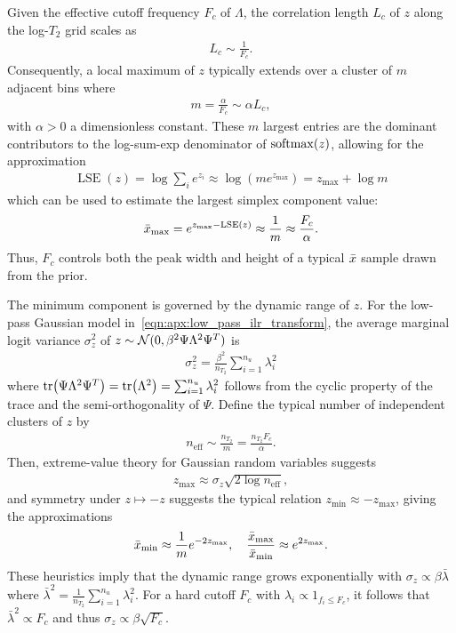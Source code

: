 Given the effective cutoff frequency $F_c$ of $\Lambda$, the correlation length $L_c$ of $z$ along the log-$T_2$ grid scales as
\begin{align}
    L_c \sim \frac{1}{F_c}.
\end{align}
Consequently, a local maximum of $z$ typically extends over a cluster of $m$ adjacent bins where
\begin{align}
    m = \frac{\alpha}{F_c} \sim \alpha L_c,
\end{align}
with $\alpha > 0$ a dimensionless constant.
These $m$ largest entries are the dominant contributors to the log-sum-exp denominator of $\Softmax{z}$, allowing for the approximation
\begin{align}
    \operatorname{LSE}(z) = \log \sum_i e^{z_i} \approx \log \left(m e^{z_{\max}}\right) = z_{\max} + \log m
\end{align}
which can be used to estimate the largest simplex component value:
\begin{align}\label{eqn:apx:xdist_max_component_estimate}
    \bar{x}_{\max} = e^{z_{\max} - \operatorname{LSE}(z)} \approx \frac{1}{m} \approx \frac{F_c}{\alpha}.
\end{align}
Thus, $F_c$ controls both the peak width and height of a typical $\bar{x}$ sample drawn from the prior.

The minimum component is governed by the dynamic range of $z$.
For the low-pass Gaussian model in~\cref{eqn:apx:low_pass_ilr_transform}, the average marginal logit variance $\sigma_z^2$ of $z \sim \mathcal{N}(\mathrm{0}, \beta^2 \Psi \Lambda^2 \Psi^T)$ is
\begin{align}
    \sigma_z^2 = \frac{\beta^2}{n_{T_2}}\sum_{i = 1}^{n_u} \lambda_i^2
\end{align}
where $\Tr{\Psi \Lambda^2 \Psi^T} = \Tr{\Lambda^2} = \sum_{i = 1}^{n_u} \lambda_i^2$ follows from the cyclic property of the trace and the semi-orthogonality of $\Psi$.
Define the typical number of independent clusters of $z$ by
\begin{align}
    n_{\mathrm{eff}} \sim \frac{n_{T_2}}{m} = \frac{n_{T_2} F_c}{\alpha}.
\end{align}
Then, extreme-value theory for Gaussian random variables suggests~\citep{leadbetter_extremes_2012}
\begin{align}
    z_{\max} \approx \sigma_z \sqrt{2 \log n_{\mathrm{eff}}},
\end{align}
and symmetry under $z \mapsto -z$ suggests the typical relation $z_{\min} \approx -z_{\max}$, giving the approximations
\begin{align}
    \bar{x}_{\min} \approx \frac{1}{m} e^{-2 z_{\max}}, \quad \frac{\bar{x}_{\max}}{\bar{x}_{\min}} \approx e^{2 z_{\max}}.
\end{align}
These heuristics imply that the dynamic range grows exponentially with $\sigma_z \propto \beta \bar{\lambda}$ where $\bar{\lambda}^2 = \frac{1}{n_{T_2}} \sum_{i = 1}^{n_u} \lambda_i^2$.
For a hard cutoff $F_c$ with $\lambda_i \propto 1_{f_i \le F_c}$, it follows that $\bar{\lambda}^2 \propto F_c$ and thus $\sigma_z \propto \beta \sqrt{F_c}$.

